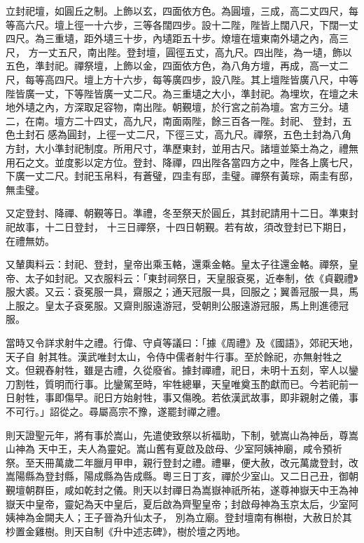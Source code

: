 \begin{pinyinscope}
 立封祀壇，如圓丘之制。上飾以玄，四面依方色。為圓壇，三成，高二丈四尺，每等高六尺。壇上徑一十六步，三等各闊四步。設十二陛，陛皆上闊八尺，下闊一丈四尺。為三重壝，距外壝三十步，內壝距五十步。燎壇在壇東南外壝之內，高三尺，
 方一丈五尺，南出陛。登封壇，圓徑五丈，高九尺。四出陛，為一壝，飾以五色，準封祀。禪祭壇，上飾以金，四面依方色，為八角方壇，再成，高一丈二尺，每等高四尺。壇上方十六步，每等廣四步，設八陛。其上壇陛皆廣八尺，中等陛皆廣一丈，下等陛皆廣一丈二尺。為三重壝之大小，準封祀。為埋坎，在壇之未地外壝之內，方深取足容物，南出陛。朝覲壇，於行宮之前為壇。宮方三分。壝二，在南。壇方二十四丈，高九尺，南面兩陛，餘三百各一陛。封祀、
 登封，五色土封石感為圓封，上徑一丈二尺，下徑三丈，高九尺。禪祭，五色土封為八角方封，大小準封祀制度。所用尺寸，準歷東封，並用古尺。諸壇並築土為之，禮無用石之文。並度影以定方位。登封、降禪，四出陛各當四方之中，陛各上廣七尺，下廣一丈二尺。封祀玉帛料，有蒼璧，四圭有邸，圭璧。禪祭有黃琮，兩圭有邸，無圭璧。



 又定登封、降禪、朝覲等日。準禮，冬至祭天於圓丘，其封祀請用十二日。準東封祀故事，十二日登封，
 十三日禪祭，十四日朝覲。若有故，須改登封已下期日，在禮無妨。



 又輦輿料云：封祀、登封，皇帝出乘玉輅，還乘金輅。皇太子往還金輅。禪祭，皇帝、太子如封祀。又衣服料云：「東封祠祭日，天皇服袞冕，近奉制，依《貞觀禮》服大裘。又云：袞冕服一具，齋服之；通天冠服一具，回服之；翼善冠服一具，馬上服之。皇太子袞冕服。又齋則服遠游冠，受朝則公服遠游冠服，馬上則進德冠服。



 當時又令詳求射牛之禮。行偉、守貞等議曰：「據《周禮》及《國語》，郊祀天地，天子自
 射其牲。漢武唯封太山，令侍中儒者射牛行事。至於餘祀，亦無射牲之文。但親舂射牲，雖是古禮，久從廢省。據封禪禮，祀日，未明十五刻，宰人以鑾刀割牲，質明而行事。比鑾駕至時，牢牲總畢，天皇唯奠玉酌獻而已。今若祀前一日射牲，事即傷早。祀日方始射牲，事又傷晚。若依漢武故事，即非親射之儀，事不可行。」詔從之。尋屬高宗不豫，遂罷封禪之禮。



 則天證聖元年，將有事於嵩山，先遣使致祭以祈福助，下制，號嵩山為神岳，尊嵩山神為
 天中王，夫人為靈妃。嵩山舊有夏啟及啟母、少室阿姨神廟，咸令預祈祭。至天冊萬歲二年臘月甲申，親行登封之禮。禮畢，便大赦，改元萬歲登封，改嵩陽縣為登封縣，陽成縣為告成縣。粵三日丁亥，禪於少室山。又二日己丑，御朝覲壇朝群臣，咸如乾封之儀。則天以封禪日為嵩嶽神祇所祐，遂尊神嶽天中王為神嶽天中皇帝，靈妃為天中皇后，夏后啟為齊聖皇帝；封啟母神為玉京太后，少室阿姨神為金闕夫人；王子晉為升仙太子，
 別為立廟。登封壇南有槲樹，大赦日於其杪置金雞樹。則天自制《升中述志碑》，樹於壇之丙地。




\end{pinyinscope}
